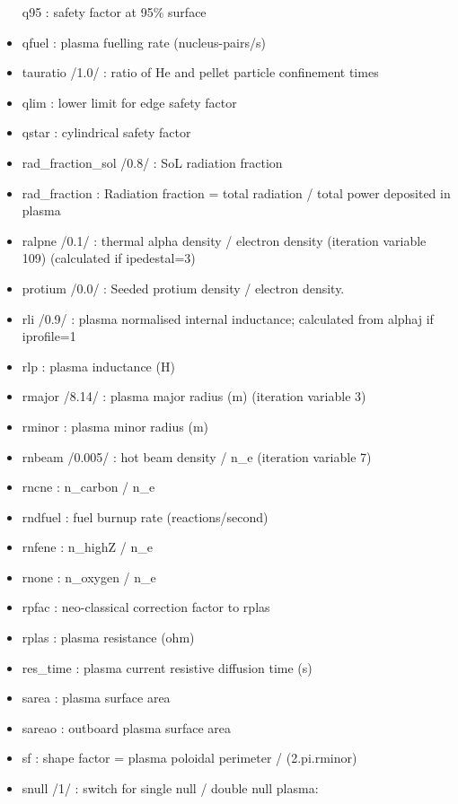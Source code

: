 \documentclass[]{article}
\begin{document}
\begin{itemize}
  q95 : safety factor at 95\% surface
\item
  qfuel : plasma fuelling rate (nucleus-pairs/s)
\item
  tauratio /1.0/ : ratio of He and pellet particle confinement times
\item
  qlim : lower limit for edge safety factor
\item
  qstar : cylindrical safety factor
\item
  rad\_fraction\_sol /0.8/ : SoL radiation fraction
\item
  rad\_fraction : Radiation fraction = total radiation / total power
  deposited in plasma
\item
  ralpne /0.1/ : thermal alpha density / electron density (iteration
  variable 109) (calculated if ipedestal=3)
\item
  protium /0.0/ : Seeded protium density / electron density.
\item
  rli /0.9/ : plasma normalised internal inductance; calculated from
  alphaj if iprofile=1
\item
  rlp : plasma inductance (H)
\item
  rmajor /8.14/ : plasma major radius (m) (iteration variable 3)
\item
  rminor : plasma minor radius (m)
\item
  rnbeam /0.005/ : hot beam density / n\_e (iteration variable 7)
\item
  rncne : n\_carbon / n\_e
\item
  rndfuel : fuel burnup rate (reactions/second)
\item
  rnfene : n\_highZ / n\_e
\item
  rnone : n\_oxygen / n\_e
\item
  rpfac : neo-classical correction factor to rplas
\item
  rplas : plasma resistance (ohm)
\item
  res\_time : plasma current resistive diffusion time (s)
\item
  sarea : plasma surface area
\item
  sareao : outboard plasma surface area
\item
  sf : shape factor = plasma poloidal perimeter / (2.pi.rminor)
\item
  snull /1/ : switch for single null / double null plasma:


\end{itemize}
\end{document}
